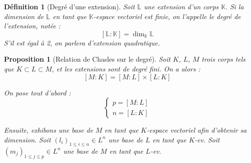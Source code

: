 \documentclass[a4paper,12pt,french]{report}
\newtheorem{proposition}{Proposition}[section]
\newtheorem{definition}{Définition}[section]
\begin{document}
			
			
			
			\begin{definition}[Degré d'une extension]
				Soit \(\mathbb{L}\) une extension d'un corps \(\mathbb{K}\). Si la dimension de \(\mathbb{L}\) en tant que \(\mathbb{K}\)-espace vectoriel est finie, on l'appelle le \emph{degré} de l'extension, notée :
				\[
				[\mathbb{L}:\mathbb{K}] = \dim_\mathbb{K}\mathbb{L}
				\]
				S'il est égal à 2, on parlera d'\emph{extension quadratique}.
			\end{definition}
			
			\begin{proposition}[Relation de Chasles sur le degré]
				Soit \(K\), \(L\), \(M\) trois corps tels que \( K \subset L \subset M\), et les extensions sont de degré fini. On a alors :
				\[
				[M:K] = [M:L]{\times} [L:K]
				\]
				\begin{preuve}
					On pose tout d'abord :
					\[
					\left\{
						\begin{array}{ll}
							p = [M:L] \\
							n = [L:K]
						\end{array}
					\right.
					\]
					
					
					Ensuite, exhibons une base de \(M\) en tant que \(K\)-espace vectoriel afin d'obtenir sa dimension.
					Soit \((l_i)_{1 \leq i \leq n} \in L^n\) une base de \(L\) en tant que \(K\)-ev.
					Soit \((m_j)_{1 \leq j \leq p} \in L^n\) une base de \(M\) en tant que \(L\)-ev.
					

\end{preuve}
\end{proposition}
\end{document}

